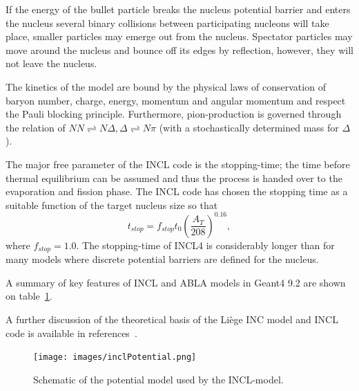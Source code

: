 If the energy of the bullet particle breaks the nucleus potential barrier and enters the nucleus several binary collisions between participating nucleons will take place, smaller particles may emerge out from the nucleus. Spectator particles may move around the nucleus and bounce off its edges by reflection, however, they will not leave the nucleus.

The kinetics of the model are bound by the physical laws of conservation of baryon number, charge, energy, momentum and angular momentum and respect the Pauli blocking principle. Furthermore, pion-production is governed through the relation of $NN \rightleftharpoons N \Delta, \Delta \rightleftharpoons N\pi$ (with a stochastically determined mass for $\Delta$).

The major free parameter of the INCL code is the stopping-time; the time before thermal equilibrium can be assumed and thus the process is handed over to the evaporation and fission phase. The INCL code has chosen the stopping time as a suitable function of the target nucleus size so that \begin{equation}t_{stop} = f_{stop}t_{0}(\frac{A_T}{208})^{0.16},\end{equation} where $f_{stop} = 1.0$. The stopping-time of INCL4 is considerably longer than for many models where discrete potential barriers are defined for the nucleus.

A summary of key features of INCL and ABLA models in Geant4 9.2 are shown on table~\ref{fig:inclpotential}.

A further discussion of the theoretical basis of the Liège INC model and INCL code is available in references~\cite{PhysRevC.66.044615,iia,incl42cascadeandabla}.

\begin{figure}[ht]
\begin{center}
\texttt{[image: images/inclPotential.png]}  
\caption{\label{fig:inclpotential} Schematic of the potential model used by the INCL-model.}
\end{center}
\end{figure}

